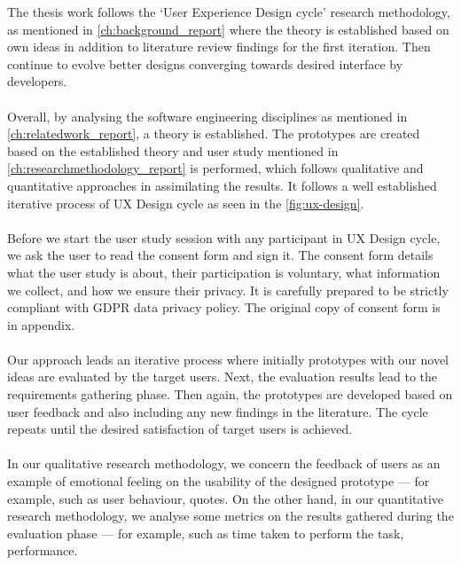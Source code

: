 The thesis work follows the ‘User Experience Design cycle’ research methodology, as mentioned in \autoref{ch:background_report} where the theory is established based on own ideas in addition to literature review findings for the first iteration. Then continue to evolve better designs converging towards desired interface by developers. \\ \\

Overall, by analysing the software engineering disciplines as mentioned in \autoref{ch:relatedwork_report}, a theory is established. The prototypes are created based on the established theory and user study mentioned in \autoref{ch:researchmethodology_report} is performed, which follows qualitative and quantitative approaches in assimilating the results. It follows a well established iterative process of UX Design cycle \cite{UX} as seen in the \autoref{fig:ux-design}. \\ \\

Before we start the user study session with any participant in UX Design cycle, we ask the user to read the consent form and sign it. The consent form details what the user study is about, their participation is voluntary, what information we collect, and how we ensure their privacy. It is carefully prepared to be strictly compliant with GDPR data privacy policy. \cite{gdpr} The original copy of consent form is in appendix. \\ \\

Our approach leads an iterative process where initially prototypes with our novel ideas are evaluated by the target users. Next, the evaluation results lead to the requirements gathering phase. Then again, the prototypes are developed based on user feedback and also including any new findings in the literature. The cycle repeats until the desired satisfaction of target users is achieved. \\ \\

In our qualitative research methodology, we concern the feedback of users as an example of emotional feeling on the usability of the designed prototype — for example, such as user behaviour, quotes. On the other hand, in our quantitative research methodology, we analyse some metrics on the results gathered during the evaluation phase — for example, such as time taken to perform the task, performance. \\ \\

